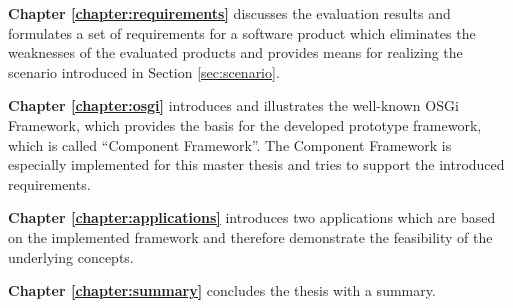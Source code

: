 \textbf{Chapter \ref{chapter:requirements}} discusses the evaluation results and formulates a set of
requirements for a software product which eliminates the weaknesses of the evaluated products and
provides means for realizing the scenario introduced in Section \ref{sec:scenario}.

\textbf{Chapter \ref{chapter:osgi}} introduces and illustrates the well-known OSGi Framework, which
provides the basis for the developed prototype framework, which is called ``Component Framework''. The
Component Framework is especially implemented for this master thesis and tries to support the
introduced requirements.

\textbf{Chapter \ref{chapter:applications}} introduces two applications which are based on the implemented
framework and therefore demonstrate the feasibility of the underlying concepts.

\textbf{Chapter \ref{chapter:summary}} concludes the thesis with a summary.